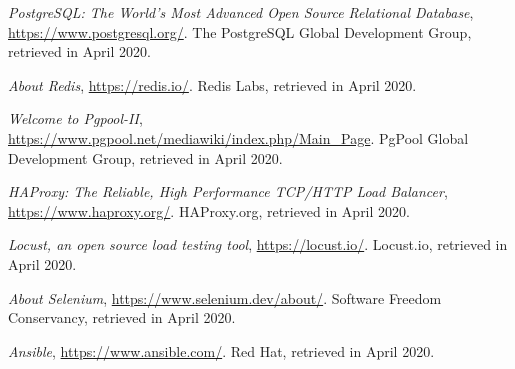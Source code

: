 \documentclass[12pt]{article}
\begin{document}
\begin{thebibliography}{9}
    \textit{PostgreSQL: The World's Most Advanced Open Source Relational Database},
    \url{https://www.postgresql.org/}.
    The PostgreSQL Global Development Group,
    retrieved in April 2020.
    \vspace{-10pt}

    \textit{About Redis},
    \url{https://redis.io/}.
    Redis Labs,
    retrieved in April 2020.
    \vspace{-10pt}

    \textit{Welcome to Pgpool-II},
    \url{https://www.pgpool.net/mediawiki/index.php/Main_Page}.
    PgPool Global Development Group,
    retrieved in April 2020.
    \vspace{-10pt}

    \textit{HAProxy: The Reliable, High Performance TCP/HTTP Load Balancer},
    \url{https://www.haproxy.org/}.
    HAProxy.org,
    retrieved in April 2020.
    \vspace{-10pt}

  

    \textit{Locust, an open source load testing tool},
    \url{https://locust.io/}.
    Locust.io,
    retrieved in April 2020.
    \vspace{-10pt}

    \textit{About Selenium},
    \url{https://www.selenium.dev/about/}.
    Software Freedom Conservancy,
    retrieved in April 2020.
    \vspace{-10pt}

    \textit{Ansible},
    \url{https://www.ansible.com/}.
    Red Hat,
    retrieved in April 2020.
    

\end{thebibliography}

\clearpage
\end{document}

